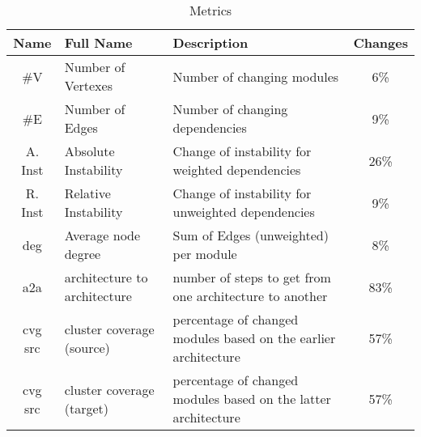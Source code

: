 \begin{table*}
	\caption{Metrics}
	\label{tableMetric}
	\begin{center}
		\begin{tabular}{ | c | l | l | c |  }
			\hline
			Name & Full Name & Description & Changes \\
			\hline
			\#V & Number of Vertexes & Number of changing modules & 6\%  \\
			\#E & Number of Edges & Number of changing dependencies & 9\% \\
			A. Inst & Absolute Instability & Change of instability for weighted dependencies & 26\% \\
			R. Inst & Relative Instability & Change of instability for unweighted dependencies & 9\% \\
			deg & Average node degree & Sum of Edges (unweighted) per module & 8\% \\
			a2a & architecture to architecture & number of steps to get from one architecture to another & 83\% \\
			cvg src & cluster coverage (source) & percentage of changed modules based on the earlier architecture & 57\% \\
			cvg src & cluster coverage (target) & percentage of changed modules based on the latter architecture & 57\% \\
			\hline
		\end{tabular}
	\end{center}
\end{table*}
